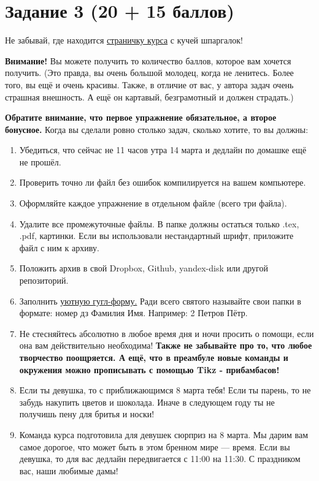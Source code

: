\documentclass[12pt, a4paper, oneside]{article}
\begin{document}
\section*{Задание 3 (20 + 15 баллов)  }

Не забывай, где находится  \href{https://fulyankin.github.io/LaTeX/}{страничку курса} с кучей шпаргалок!

\textbf{Внимание!}  Вы можете получить то количество баллов, которое вам хочется получить. (Это правда, вы очень большой молодец, когда не ленитесь. Более того, вы ещё и очень красивы. Также, в отличие от вас, у автора задач очень страшная внешность. А ещё он картавый, безграмотный и должен страдать.)

\textbf{Обратите внимание, что первое упражнение обязательное, а второе бонусное.} Когда вы сделали ровно столько задач, сколько хотите, то вы должны:

\begin{enumerate}
\item Убедиться, что сейчас не 11 часов утра 14 марта и дедлайн по домашке ещё не прошёл.
\item Проверить точно ли файл без ошибок компилируется на вашем компьютере.
\item Оформляйте каждое упражнение в отдельном файле (всего три файла).
\item Удалите все промежуточные файлы. В папке должны остаться только .tex, .pdf, картинки. Если вы использовали нестандартный шрифт, приложите файл с ним к архиву.
\item Положить архив в	свой	Dropbox,	Github,	yandex-disk	или
другой	репозиторий.
\item Заполнить	\href{https://docs.google.com/forms/d/e/1FAIpQLSe11kxKVfv07iCL1E9yNX7ll9swKImiVwRr1H70lslGzInRSg/viewform}{уютную гугл-форму.} Ради всего святого называйте свои папки в формате: номер дз Фамилия Имя. Например: 2 Петров Пётр.
\item Не стесняйтесь абсолютно в любое время дня и ночи просить о помощи, если она вам действительно необходима! \textbf{Также не забывайте про то, что любое творчество поощряется. А ещё, что в преамбуле новые команды и окружения можно прописывать с помощью Tikz - прибамбасов! }
\item Если ты девушка, то с приближающимся 8 марта тебя! Если ты парень, то не забудь накупить цветов и шоколада. Иначе в следующем году ты не получишь пену для бритья и носки!
\item Команда курса подготовила для девушек сюрприз на 8 марта. Мы дарим вам самое дорогое, что может быть в этом бренном мире --- время.  Если вы девушка, то для вас дедлайн передвигается с 11:00 на 11:30. С праздником вас, наши любимые дамы!
\end{enumerate}
\end{document}
